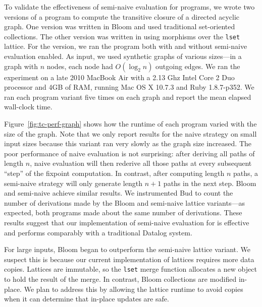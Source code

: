 To validate the effectiveness of semi-naive evaluation for \lang programs, we
wrote two versions of a program to compute the transitive closure of a directed
acyclic graph. One version was written in Bloom and used traditional
set-oriented collections. The other version was written in \lang using morphisms
over the \texttt{lset} lattice. For the \lang version, we ran the program both
with and without semi-naive evaluation enabled. As input, we used synthetic
graphs of various sizes---in a graph with $n$ nodes, each node had $O(\log_2 n)$
outgoing edges. We ran the experiment on a late 2010 MacBook Air with a 2.13 Ghz
Intel Core 2 Duo processor and 4GB of RAM, running Mac OS X 10.7.3 and Ruby
1.8.7-p352. We ran each program variant five times on each graph and report the
mean elapsed wall-clock time.

Figure~\ref{fig:tc-perf-graph} shows how the runtime of each program varied with
the size of the graph. Note that we only report results for the naive \lang
strategy on small input sizes because this variant ran very slowly as the graph
size increased. The poor performance of naive evaluation is not surprising:
after deriving all paths of length $n$, naive evaluation will then rederive all
those paths at every subsequent ``step'' of the fixpoint computation. In
contrast, after computing length $n$ paths, a semi-naive strategy will only
generate length $n+1$ paths in the next step. Bloom and semi-naive \lang achieve
similar results. We instrumented Bud to count the number of derivations made by
the Bloom and semi-naive lattice variants---as expected, both programs made about
the same number of derivations. These results suggest that our implementation of
semi-naive evaluation for \lang is effective and performs comparably with a
traditional Datalog system.

For large inputs, Bloom began to outperform the semi-naive lattice variant. We
suspect this is because our current implementation of lattices requires more
data copies. Lattices are immutable, so the \texttt{lset} merge function
allocates a new object to hold the result of the merge. In contrast, Bloom
collections are modified in-place. We plan to address this by allowing the
lattice runtime to avoid copies when it can determine that in-place updates are
safe.

